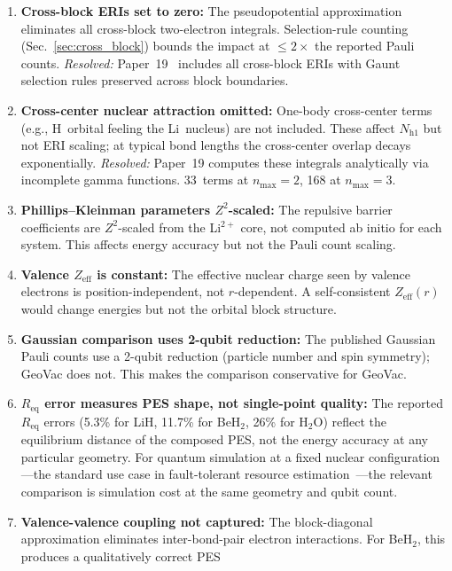 \documentclass[aps,pra,twocolumn,superscriptaddress,longbibliography]{revtex4-2}
\begin{document}
\begin{enumerate}
\item \textbf{Cross-block ERIs set to zero:} The pseudopotential
  approximation eliminates all cross-block two-electron integrals.
  Selection-rule counting (Sec.~\ref{sec:cross_block}) bounds the
  impact at $\le 2\times$ the reported Pauli counts.
  \textit{Resolved:} Paper~19~\cite{loutey_paper19} includes all
  cross-block ERIs with Gaunt selection rules preserved across
  block boundaries.
\item \textbf{Cross-center nuclear attraction omitted:} One-body
  cross-center terms (e.g., H~orbital feeling the Li~nucleus) are
  not included.  These affect $N_{\mathrm{h1}}$ but not ERI scaling;
  at typical bond lengths the cross-center overlap decays
  exponentially.
  \textit{Resolved:} Paper~19 computes these integrals analytically
  via incomplete gamma functions.  33~terms at $n_{\max}=2$,
  168 at $n_{\max}=3$.
\item \textbf{Phillips--Kleinman parameters $Z^2$-scaled:} The
  repulsive barrier coefficients are $Z^2$-scaled from the
  Li$^{2+}$ core, not computed ab initio for each system.  This
  affects energy accuracy but not the Pauli count scaling.
\item \textbf{Valence $Z_{\mathrm{eff}}$ is constant:} The effective
  nuclear charge seen by valence electrons is position-independent,
  not $r$-dependent.  A self-consistent $Z_{\mathrm{eff}}(r)$ would
  change energies but not the orbital block structure.
\item \textbf{Gaussian comparison uses 2-qubit reduction:} The
  published Gaussian Pauli counts use a 2-qubit reduction
  (particle number and spin symmetry); GeoVac does not.  This
  makes the comparison conservative for GeoVac.
\item \textbf{$R_{\mathrm{eq}}$ error measures PES shape, not
  single-point quality:} The reported $R_{\mathrm{eq}}$ errors
  (5.3\% for LiH, 11.7\% for BeH$_2$, 26\% for H$_2$O) reflect
  the equilibrium distance of the composed PES, not the energy
  accuracy at any particular geometry.  For quantum simulation at
  a fixed nuclear configuration---the standard use case in
  fault-tolerant resource estimation~\cite{lee2021,reiher2017}---the
  relevant comparison is simulation cost at the same geometry and
  qubit count.
\item \textbf{Valence-valence coupling not captured:} The
  block-diagonal approximation eliminates inter-bond-pair electron
  interactions.  For BeH$_2$, this produces a qualitatively correct PES

\end{enumerate}
\end{document}

